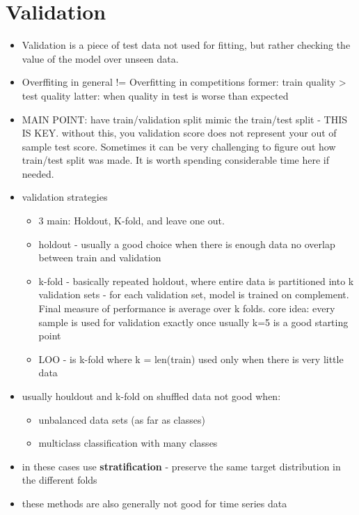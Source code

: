 \documentclass[a4paper]{report}
\begin{document}
\section{Validation}
\begin{itemize}
  \item Validation is a piece of test data not used for fitting, but rather checking the value of the model over unseen data. 
  \item Overffiting in general != Overfitting in competitions
    \subitem former: train quality > test quality
    \subitem latter: when quality in test is worse than expected
  \item MAIN POINT: have train/validation split mimic the train/test split - THIS IS KEY. 
    \subitem without this, you validation score does not represent your out of sample test score.
    \subitem Sometimes it can be very challenging to figure out how train/test split was made. It is worth spending considerable time here if needed.
  \item validation strategies
    \begin{itemize}
      \item  3 main: Holdout, K-fold, and leave one out.
      \item holdout - usually a good choice when there is enough data
	\subitem no overlap between train and validation
      \item k-fold - basically repeated holdout, where entire data is partitioned into k validation sets - for each validation set, model is trained on complement. Final measure of performance is average over k folds.
	\subitem core idea: every sample is used for validation exactly once
	\subitem usually k=5 is a good starting point
      \item LOO - is k-fold where k = len(train)
	\subitem used only when there is very little data
    \end{itemize}
  \item usually houldout and k-fold on shuffled data not good when:
    \begin{itemize}
      \item unbalanced data sets (as far as classes)
      \item multiclass classification with many classes
    \end{itemize}
  \item in these cases use {\bf stratification} - preserve the same target distribution in the different folds
  \item these methods are also generally not good for time series data

\end{itemize}
\end{document}
